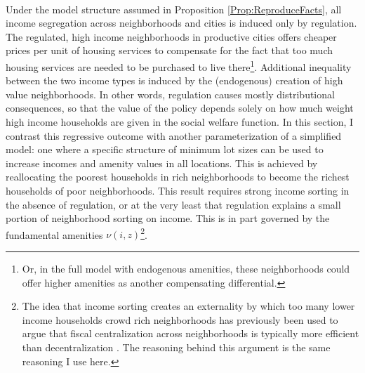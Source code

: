 \documentclass[12pt]{article}
\begin{document}
\paragraph*{}
Under the model structure assumed in Proposition \ref{Prop:ReproduceFacts}, all income segregation across neighborhoods and cities is induced only by regulation. The regulated, high income neighborhoods in productive cities offers cheaper prices per unit of housing services to compensate for the fact that too much housing services are needed to be purchased to live there\footnote{Or, in the full model with endogenous amenities, these neighborhoods could offer higher amenities as another compensating differential.}. Additional inequality between the two income types is induced by the (endogenous) creation of high value neighborhoods. In other words, regulation causes mostly distributional consequences, so that the value of the policy depends solely on how much weight high income households are given in the social welfare function. In this section, I contrast this regressive outcome with another parameterization of a simplified model: one where a specific structure of minimum lot sizes can be used to increase incomes and amenity values in all locations. This is achieved by reallocating the poorest households in rich neighborhoods to become the richest households of poor neighborhoods. This result requires strong income sorting in the absence of regulation, or at the very least that regulation explains a small portion of neighborhood sorting on income. This is in part governed by the fundamental amenities $\nu(i, z)$\footnote{The idea that income sorting creates an externality by which too many lower income households crowd rich neighborhoods has previously been used to argue that fiscal centralization across neighborhoods is typically more efficient than decentralization \citep{ineffTiebout}. The reasoning behind this argument is the same reasoning I use here.}.
\end{document}
